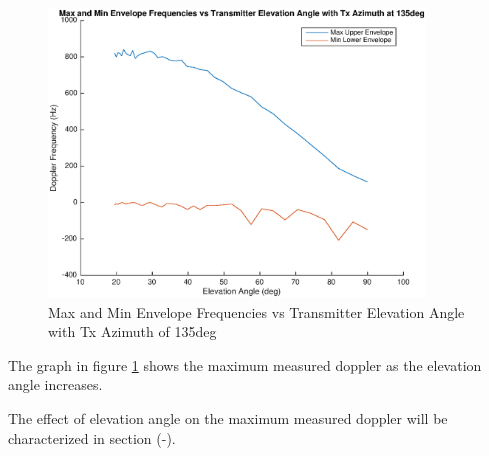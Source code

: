  \begin{figure}
	\begin{center}
		\includegraphics[width=10cm]{images/simulation/elevation_angle_max_doppler_135deg.eps}
		\caption{Max and Min Envelope Frequencies vs Transmitter Elevation Angle with Tx Azimuth of 135deg}
		\label{fig:tx_elevation_135deg}
	\end{center}
\end{figure}

The graph in figure \ref{fig:tx_elevation_135deg} shows the maximum measured doppler as the elevation angle increases. 

The effect of elevation angle on the maximum measured doppler will be characterized in section (-).



